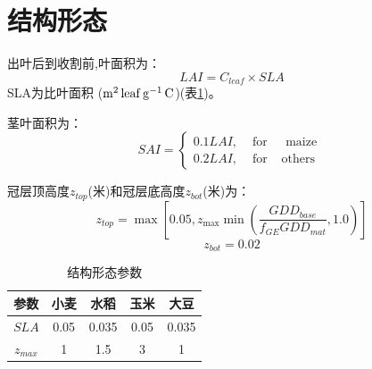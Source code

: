 \section{结构形态}
出叶后到收割前,叶面积为：
\begin{equation}
LAI=C_{leaf} \times SLA
\end{equation}
SLA为比叶面积 ($\rm m^2 \,leaf\, g^{-1}\, C$)(表\ref{tab:结构形态参数})。

茎叶面积为：
\begin{equation}
SAI=\left\{\begin{array}{lcc}0.1 LAI, & \text { for } & \text { maize } \\
   0.2 LAI, & \text { for } & \text {others}\end{array}\right.
\end{equation}

冠层顶高度$z_{top}$(米)和冠层底高度$z_{bot}$(米)为：
\begin{equation}
z_{top}=\max \left[0.05, z_{\max} \min \left(\frac{GDD_{base}}{f_{GE} G D D_{mat}}, 1.0\right)\right]
\end{equation}
\begin{equation}
z_{b o t}=0.02
\end{equation}

\begin{table}[]
  \centering
  \caption{结构形态参数}
  \label{tab:结构形态参数}
  \begin{tabular}{@{}ccccc@{}}
  \toprule
  参数   & 小麦   & 水稻    & 玉米   & 大豆    \\ \midrule
  $SLA$  & 0.05 & 0.035 & 0.05 & 0.035 \\
  $z_{max}$ & 1    & 1.5   & 3    & 1     \\ \bottomrule
  \end{tabular}
\end{table}
